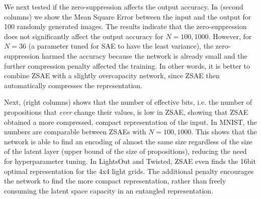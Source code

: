 We next tested if the zero-suppression affects the output accuracy.
In  (second columns)
we show the Mean Square Error between the input and the output
for 100 randomly generated images.
The results indicate that the zero-suppression does not significantly affect the output accuracy for $N=100,1000$.
However, for $N=36$ (a parameter tuned for SAE to have the least variance), the zero-suppression
harmed the accuracy because the network is already small and the further compression penalty affected the training.
In other words, it is better to combine ZSAE with a slightly overcapacity network,
since ZSAE then automatically compresses the representation.

Next,  (right columns) shows that the number of effective bits,
i.e. the number of propositions that \emph{ever} change their values, is low in ZSAE, showing that
ZSAE obtained a more compressed, compact representation of the input.
In MNIST, the numbers are comparable between ZSAEs with $N=100,1000$.
This shows that the network is able to find an encoding of almost the same size
regardless of the size of the latent layer (upper bound of the size of
propositions), reducing the need for hyperparameter tuning.
In LightsOut and Twisted, ZSAE even finds the 16bit optimal representation for the 4x4 light grids.
The additional
penalty encourages the network to find the more compact representation,
rather than freely consuming the latent space capacity in an entangled representation.


